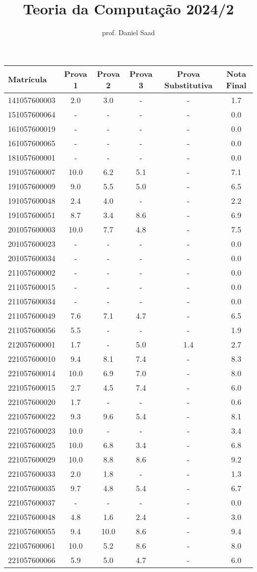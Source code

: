 \documentclass{article}
\title{ Teoria da Computação 2024/2}
\date{}
\author{ prof. Daniel Saad}
\begin{document}
 \maketitle
    \begin{longtable}{|l|c|c|c|c|c|}
    \hline
Matrícula & Prova 1 & Prova 2 & Prova 3 & Prova Substitutiva & Nota Final\\\hline \endhead   
141057600003 & 2.0 & 3.0 & - & - & 1.7\\\hline
151057600064 & - & - & - & - & 0.0\\\hline
161057600019 & - & - & - & - & 0.0\\\hline
161057600065 & - & - & - & - & 0.0\\\hline
181057600001 & - & - & - & - & 0.0\\\hline
191057600007 & 10.0 & 6.2 & 5.1 & - & 7.1\\\hline
191057600009 & 9.0 & 5.5 & 5.0 & - & 6.5\\\hline
191057600048 & 2.4 & 4.0 & - & - & 2.2\\\hline
191057600051 & 8.7 & 3.4 & 8.6 & - & 6.9\\\hline
201057600003 & 10.0 & 7.7 & 4.8 & - & 7.5\\\hline
201057600023 & - & - & - & - & 0.0\\\hline
201057600034 & - & - & - & - & 0.0\\\hline
211057600002 & - & - & - & - & 0.0\\\hline
211057600015 & - & - & - & - & 0.0\\\hline
211057600034 & - & - & - & - & 0.0\\\hline
211057600049 & 7.6 & 7.1 & 4.7 & - & 6.5\\\hline
211057600056 & 5.5 & - & - & - & 1.9\\\hline
212057600001 & 1.7 & - & 5.0 & 1.4 & 2.7\\\hline
221057600010 & 9.4 & 8.1 & 7.4 & - & 8.3\\\hline
221057600014 & 10.0 & 6.9 & 7.0 & - & 8.0\\\hline
221057600015 & 2.7 & 4.5 & 7.4 & - & 6.0\\\hline
221057600020 & 1.7 & - & - & - & 0.6\\\hline
221057600022 & 9.3 & 9.6 & 5.4 & - & 8.1\\\hline
221057600023 & 10.0 & - & - & - & 3.4\\\hline
221057600025 & 10.0 & 6.8 & 3.4 & - & 6.8\\\hline
221057600029 & 10.0 & 8.8 & 8.6 & - & 9.2\\\hline
221057600033 & 2.0 & 1.8 & - & - & 1.3\\\hline
221057600035 & 9.7 & 4.8 & 5.4 & - & 6.7\\\hline
221057600037 & - & - & - & - & 0.0\\\hline
221057600048 & 4.8 & 1.6 & 2.4 & - & 3.0\\\hline
221057600055 & 9.4 & 10.0 & 8.6 & - & 9.4\\\hline
221057600061 & 10.0 & 5.2 & 8.6 & - & 8.0\\\hline
221057600066 & 5.9 & 5.0 & 4.7 & - & 6.0\\\hline
\end{longtable}
\end{document}
